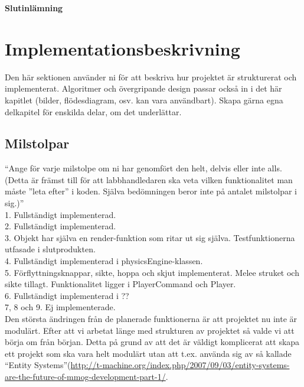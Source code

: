 \begin{center}
  \textbf{\Huge Slutinlämning}\\[1cm]
\end{center}
\section{Implementationsbeskrivning}
{\color{red}Den här sektionen använder ni för att beskriva hur projektet är strukturerat och implementerat. Algoritmer och övergripande design passar också in i det här kapitlet (bilder, flödesdiagram, osv. kan vara användbart). Skapa gärna egna delkapitel för enskilda delar, om det underlättar.\\ }
\subsection{Milstolpar}
{\color{red}``Ange för varje milstolpe om ni har genomfört den helt, delvis eller inte alls.  (Detta är främst till för att labbhandledaren ska veta vilken funktionalitet man måste ”leta efter” i koden.  Själva bedömningen beror inte på antalet milstolpar i sig.)''\\}
1. Fullständigt implementerad.\\
2. Fullständigt implementerad.\\
3. Objekt har själva en render-funktion som ritar ut sig själva. Testfunktionerna utfasade i slutprodukten.\\
4. Fullständigt implementerad i physicsEngine-klassen.\\
5. Förflyttningsknappar, sikte, hoppa och skjut implementerat. Melee struket och sikte tillagt. Funktionalitet ligger i PlayerCommand och Player.\\
6. Fullständigt implementerad i ??\\
7, 8 och 9. Ej implementerade.\\
Den största ändringen från de planerade funktionerna är att projektet nu inte är modulärt. Efter att vi arbetat länge med strukturen av projektet så valde vi att börja om från början. Detta på grund av att det är väldigt komplicerat att skapa ett projekt som ska vara helt modulärt utan att t.ex. använda sig av så kallade ``Entity Systems''(\url{http://t-machine.org/index.php/2007/09/03/entity-systems-are-the-future-of-mmog-development-part-1/}.\\
